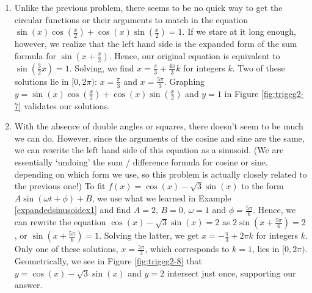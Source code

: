 {\begin{enumerate}
from which we get $\cos(x) = 0$ or $\sin(x) = \frac{\sqrt{3}}{2}$. From $\cos(x) = 0$, we obtain $x = \frac{\pi}{2} + \pi k$ for integers $k$. From $\sin(x) = \frac{\sqrt{3}}{2}$, we get $x = \frac{\pi}{3} + 2\pi k$ or $x = \frac{2\pi}{3} + 2\pi k$ for integers $k$.  The answers which lie in $[0,2\pi)$ are $x = \frac{\pi}{2}$, $\frac{3\pi}{2}$, $\frac{\pi}{3}$ and $\frac{2\pi}{3}$.  We graph $y = \sin(2x)$ and $y = \sqrt{3} \cos(x)$ in Figure \ref{fig:trigeg2-6} to  verify our answers.


\item Unlike the previous problem, there seems to be no quick way to get the circular functions or their arguments to match in the equation $\sin(x)\cos\left(\frac{x}{2}\right) + \cos(x)\sin\left(\frac{x}{2}\right) = 1$.  If we stare at it long enough, however,  we realize that the left hand side is the expanded form of the sum formula for $\sin\left(x + \frac{x}{2}\right)$.  Hence, our original equation is equivalent to  $\sin\left(\frac{3}{2} x\right) = 1$.  Solving, we find $x = \frac{\pi}{3} + \frac{4\pi}{3} k$ for integers $k$.  Two of these solutions lie in $[0,2\pi)$: $x = \frac{\pi}{3}$ and $x = \frac{5\pi}{3}$. Graphing $y = \sin(x)\cos\left(\frac{x}{2}\right) + \cos(x)\sin\left(\frac{x}{2}\right)$ and $y = 1$ in Figure \ref{fig:trigeg2-7}  validates our solutions.


\item  With the absence of double angles or squares, there doesn't seem to be much we can do.  However, since the arguments of the cosine and sine are the same, we can rewrite the left hand side of this equation as a sinusoid. (We are essentially `undoing' the sum / difference formula for cosine or sine, depending on which form we use, so this problem is actually closely related to the previous one!)  To fit $f(x) = \cos(x) - \sqrt{3} \sin(x)$ to the form $A\sin(\omega t + \phi) + B$, we use what we learned in Example \ref{expandedsinusoidex1} and find $A = 2$, $B = 0$, $\omega = 1$ and $\phi = \frac{5\pi}{6}$.   Hence, we can rewrite the equation  $\cos(x) - \sqrt{3} \sin(x) = 2$  as $2 \sin\left(x + \frac{5\pi}{6}\right) = 2$, or $\sin\left(x + \frac{5\pi}{6}\right) = 1$.  Solving the latter, we get $x  = - \frac{\pi}{3} + 2\pi k$ for integers $k$. Only one of these solutions, $x = \frac{5\pi}{3}$, which corresponds to $k=1$, lies in $[0,2\pi)$.  Geometrically, we see in Figure \ref{fig:trigeg2-8} that $y = \cos(x) - \sqrt{3} \sin(x)$ and $y = 2$ intersect just once, supporting our answer.


\end{enumerate}
}
 
